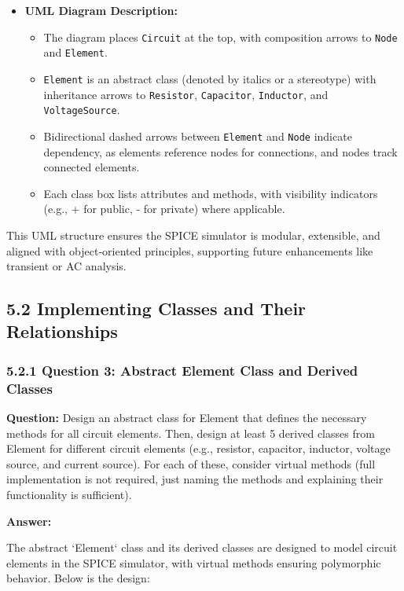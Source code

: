 \documentclass{article}
\begin{document}
\begin{itemize}
    \item \textbf{UML Diagram Description:}
    \begin{itemize}
        \item The diagram places \texttt{Circuit} at the top, with composition arrows to \texttt{Node} and \texttt{Element}.
        \item \texttt{Element} is an abstract class (denoted by italics or a stereotype) with inheritance arrows to \texttt{Resistor}, \texttt{Capacitor}, \texttt{Inductor}, and \texttt{VoltageSource}.
        \item Bidirectional dashed arrows between \texttt{Element} and \texttt{Node} indicate dependency, as elements reference nodes for connections, and nodes track connected elements.
        \item Each class box lists attributes and methods, with visibility indicators (e.g., + for public, - for private) where applicable.
    \end{itemize}
\end{itemize}

This UML structure ensures the SPICE simulator is modular, extensible, and aligned with object-oriented principles, supporting future enhancements like transient or AC analysis.
\subsection*{5.2 Implementing Classes and Their Relationships}

\subsubsection*{5.2.1 Question 3: Abstract Element Class and Derived Classes}

\textbf{Question:} Design an abstract class for Element that defines the necessary methods for all circuit elements. Then, design at least 5 derived classes from Element for different circuit elements (e.g., resistor, capacitor, inductor, voltage source, and current source). For each of these, consider virtual methods (full implementation is not required, just naming the methods and explaining their functionality is sufficient).

\textbf{Answer:}

The abstract `Element` class and its derived classes are designed to model circuit elements in the SPICE simulator, with virtual methods ensuring polymorphic behavior. Below is the design:
\end{document}
